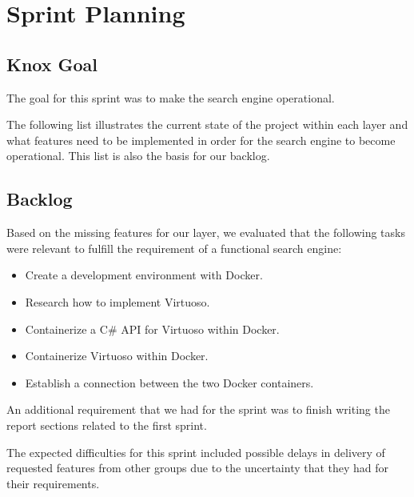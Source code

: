 
\section{Sprint Planning}
\subsection*{Knox Goal}
The goal for this sprint was to make the search engine operational.

The following list illustrates the current state of the \knox{} project within each layer and what features need to be implemented in order for the search engine to become operational. This list is also the basis for our backlog.



\subsection*{Backlog}
Based on the missing features for our layer, we evaluated that the following tasks were relevant to fulfill the requirement of a functional search engine:
\begin{itemize}
    \item Create a development environment with Docker.
    \item Research how to implement Virtuoso.
    \item Containerize a C\# API for Virtuoso within Docker.
    \item Containerize Virtuoso within Docker.
    \item Establish a connection between the two Docker containers.
\end{itemize}

An additional requirement that we had for the sprint was to finish writing the report sections related to the first \knox{} sprint.

The expected difficulties for this sprint included possible delays in delivery of requested features from other groups due to the uncertainty that they had for their requirements. 
